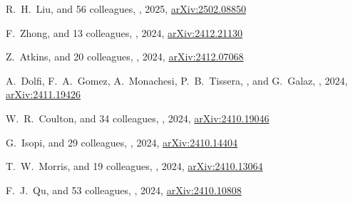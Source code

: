 \begin{etaremune}
\item
R.~H.~Liu, and 56 colleagues,
,
2025, \href{https://ui.adsabs.harvard.edu/abs/2025arXiv250208850L}{arXiv:2502.08850}
\submitted{\prd}

\item
F.~Zhong, and 13 colleagues,
,
2024, \href{https://ui.adsabs.harvard.edu/abs/2024arXiv241221130Z}{arXiv:2412.21130}
\submitted{\mnras}

\item
Z.~Atkins, and 20 colleagues,
,
2024, \href{https://ui.adsabs.harvard.edu/abs/2024arXiv241207068A}{arXiv:2412.07068}
\submitted{\jcap}
    
\item
A.~Dolfi, F.~A.~Gomez, A.~Monachesi, P.~B.~Tissera, \myself, and G.~Galaz,
,
2024, \href{https://ui.adsabs.harvard.edu/abs/2024arXiv241119426D}{arXiv:2411.19426}
\submitted{\mnras}
    
\item
W.~R.~Coulton, and 34 colleagues,
,
2024, \href{https://ui.adsabs.harvard.edu/abs/2024arXiv241019046C}{arXiv:2410.19046}
\submitted{\prd}

\item
G.~Isopi, and 29 colleagues,
,
2024, \href{https://ui.adsabs.harvard.edu/abs/2024arXiv241014404I}{arXiv:2410.14404}
\submitted{\jcap}

\item
T.~W.~Morris, and 19 colleagues,
,
2024, \href{https://ui.adsabs.harvard.edu/abs/2024arXiv241013064M}{arXiv:2410.13064}
\submitted{\apj}

\item
F.~J.~Qu, and 53 colleagues,
,
2024, \href{https://ui.adsabs.harvard.edu/abs/2024arXiv241010808Q}{arXiv:2410.10808}
\submitted{\apj}


\end{etaremune}
